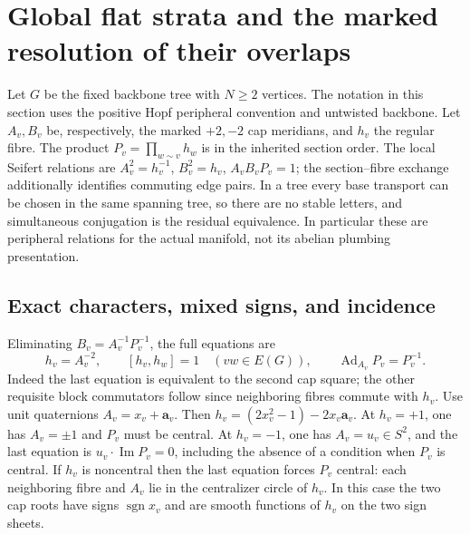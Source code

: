 \section{Global flat strata and the marked resolution of their overlaps}
\label{geo:sec}

Let \(G\) be the fixed backbone tree with \(N\geq2\) vertices. The notation in this section uses the positive Hopf peripheral convention and untwisted backbone. Let \(A_v,B_v\) be, respectively, the marked \(+2,-2\) cap meridians, and \(h_v\) the regular fibre. The product
\(P_v=\prod_{w\sim v}h_w\) is in the inherited section order. The local Seifert relations are \(A_v^2=h_v^{-1}\), \(B_v^2=h_v\), \(A_vB_vP_v=1\); the section--fibre exchange additionally identifies commuting edge pairs. In a tree every base transport can be chosen in the same spanning tree, so there are no stable letters, and simultaneous conjugation is the residual equivalence. In particular these are peripheral relations for the actual manifold, not its abelian plumbing presentation.

\subsection{Exact characters, mixed signs, and incidence}
Eliminating \(B_v=A_v^{-1}P_v^{-1}\), the full equations are
\begin{equation}
 h_v=A_v^{-2},\qquad [h_v,h_w]=1\quad(vw\in E(G)),\qquad
 \operatorname{Ad}_{A_v}P_v=P_v^{-1}.
 \label{geo:flat}
\end{equation}
Indeed the last equation is equivalent to the second cap square; the other requisite block commutators follow since neighboring fibres commute with \(h_v\). Use unit quaternions \(A_v=x_v+\mathbf a_v\). Then \(h_v=(2x_v^2-1)-2x_v\mathbf a_v\). At \(h_v=+1\), one has \(A_v=\pm1\) and \(P_v\) must be central. At \(h_v=-1\), one has \(A_v=u_v\in S^2\), and the last equation is
\(u_v\cdot \operatorname{Im}P_v=0\), including the absence of a condition when \(P_v\) is central. If \(h_v\) is noncentral then the last equation forces \(P_v\) central: each neighboring fibre and \(A_v\) lie in the centralizer circle of \(h_v\). In this case the two cap roots have signs \(\operatorname{sgn}x_v\) and are smooth functions of \(h_v\) on the two sign sheets.

